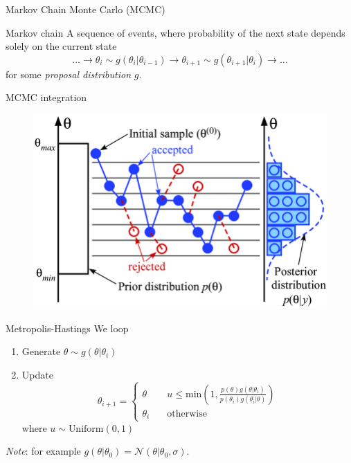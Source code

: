 \documentclass[
aspectratio=169,
14pt,
professionalfonts
]{beamer}
\begin{document}
\begin{frame}
\center
\Large
Markov Chain Monte Carlo (MCMC)
\end{frame}

\begin{frame}{Markov chain}
    A sequence of events, where probability of the next state depends solely on the current state
    $$
    \ldots \to \theta_{i} \sim g(\theta_{i} | \theta_{i-1}) \to \theta_{i+1} \sim g(\theta_{i+1} | \theta_{i}) \to \ldots
    $$
    for some \textit{proposal distribution} $g$. 
\end{frame}
\begin{frame}{MCMC integration}
    \begin{figure}
        \centering
        \href{https://doi.org/10.3390/app10010272}{
        \includegraphics[width=0.6\linewidth]{../plots/mcmc_diagram.png}
        }
    \end{figure}
\end{frame}

\begin{frame}{Metropolis-Hastings}
We loop
\begin{enumerate}
    \item Generate $\theta \sim g(\theta|\theta_i)$
    \item Update
    \begin{equation*}
        \theta_{i+1} =
        \begin{cases}
            \theta  &\quad u \leq \text{min}\left(1, \frac{p(\theta)g(\theta|\theta_i)}{p(\theta_i)g(\theta_i|\theta)}\right)\\
            \theta_i &\quad \text{otherwise}
        \end{cases}
    \end{equation*}
    where $u \sim \text{Uniform}(0, 1)$
\end{enumerate}
\textit{Note}: for example $g(\theta|\theta_0) = \mathcal{N}(\theta|\theta_0, \sigma)$.
\end{frame}
\end{document}
